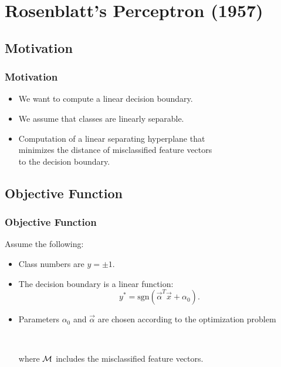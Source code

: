 \section{Rosenblatt's Perceptron (1957)}

\subsection{Motivation}

\begin{frame}
  \frametitle{Motivation}

  \begin{itemize}
    \item We want to compute a linear decision boundary. \\[.5cm]
    \item We assume that classes are linearly separable. \\[.5cm]
    \item Computation of a linear separating hyperplane that\\
      minimizes the distance of misclassified feature vectors \\
      to the decision boundary.
  \end{itemize}
\end{frame}


\subsection{Objective Function}

\begin{frame}
  \frametitle{Objective Function}

  Assume the following:

  \begin{itemize}
    \item Class numbers are $y=\pm 1$.
    \item The decision boundary is a linear function:
      \begin{displaymath}
        y^* = \mbox{sgn}(\vec \alpha^T\vec x + \alpha_0).
      \end{displaymath}
      \pause
    \item Parameters $\alpha_0$ and $\vec \alpha$ are chosen according to the optimization problem \\[.2cm]

      \begin{center}
        \\[.2cm]
      \end{center}

      where $\cal M$ includes the misclassified feature vectors.
  \end{itemize}
\end{frame}


